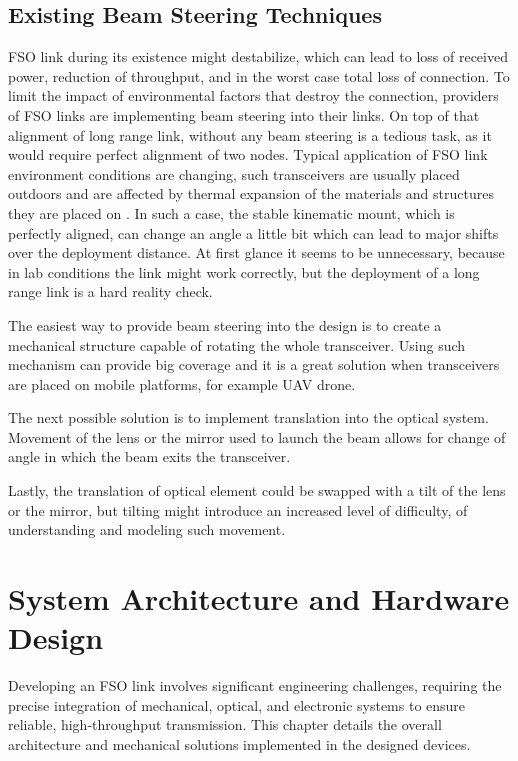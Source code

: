 \documentclass[master,oneside,en,oldtitlepage]{dyplompwr}
\begin{document}
\section{Existing Beam Steering Techniques}
FSO link during its existence might destabilize, which can lead to loss of received power, reduction of throughput, and in the worst case total loss of connection.
To limit the impact of environmental factors that destroy the connection, providers of FSO links are implementing beam steering into their links.
On top of that alignment of long range link, without any beam steering is a tedious task, as it would require perfect alignment of two nodes.
Typical application of FSO link environment conditions are changing, such transceivers are usually placed outdoors and are affected by thermal expansion of the materials and structures they are placed on \cite{ruadulescu2022thermal}. In such a case, the stable kinematic mount, which is perfectly aligned, can change an angle a little bit which can lead to major shifts over the deployment distance.
At first glance it seems to be unnecessary, because in lab conditions the link might work correctly, but the deployment of a long range link is a hard reality check.


The easiest way to provide beam steering into the design is to create a mechanical structure capable of rotating the whole transceiver. 
Using such mechanism can provide big coverage and it is a great solution when transceivers are placed on mobile platforms, for example UAV drone.

The next possible solution is to implement translation into the optical system.
Movement of the lens or the mirror used to launch the beam allows for change of angle in which the beam exits the transceiver.

Lastly, the translation of optical element could be swapped with a tilt of the lens or the mirror, but tilting might introduce an increased level of difficulty, of understanding and modeling such movement.


\chapter{System Architecture and Hardware Design}

Developing an FSO link involves significant engineering challenges, requiring the precise integration of mechanical, optical, and electronic systems to ensure reliable, high-throughput transmission. This chapter details the overall architecture and mechanical solutions implemented in the designed devices.
\end{document}
